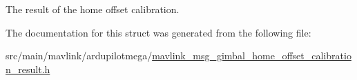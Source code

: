 The result of the home offset calibration. 



The documentation for this struct was generated from the following file\+:\begin{DoxyCompactItemize}
\item 
src/main/mavlink/ardupilotmega/\hyperlink{mavlink__msg__gimbal__home__offset__calibration__result_8h}{mavlink\+\_\+msg\+\_\+gimbal\+\_\+home\+\_\+offset\+\_\+calibration\+\_\+result.\+h}\end{DoxyCompactItemize}
